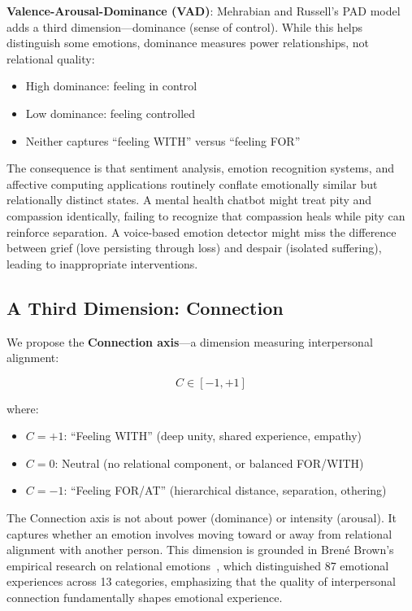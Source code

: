 \textbf{Valence-Arousal-Dominance (VAD)}: Mehrabian and Russell's PAD model~\cite{mehrabian1974} adds a third dimension—dominance (sense of control). While this helps distinguish some emotions, dominance measures power relationships, not relational quality:
\begin{itemize}
    \item High dominance: feeling in control
    \item Low dominance: feeling controlled
    \item Neither captures ``feeling WITH'' versus ``feeling FOR''
\end{itemize}

The consequence is that sentiment analysis, emotion recognition systems, and affective computing applications routinely conflate emotionally similar but relationally distinct states. A mental health chatbot might treat pity and compassion identically, failing to recognize that compassion heals while pity can reinforce separation. A voice-based emotion detector might miss the difference between grief (love persisting through loss) and despair (isolated suffering), leading to inappropriate interventions.

\subsection{A Third Dimension: Connection}

We propose the \textbf{Connection axis}—a dimension measuring interpersonal alignment:

$$C \in [-1, +1]$$

where:
\begin{itemize}
    \item $C = +1$: ``Feeling WITH'' (deep unity, shared experience, empathy)
    \item $C = 0$: Neutral (no relational component, or balanced FOR/WITH)
    \item $C = -1$: ``Feeling FOR/AT'' (hierarchical distance, separation, othering)
\end{itemize}

The Connection axis is not about power (dominance) or intensity (arousal). It captures whether an emotion involves moving toward or away from relational alignment with another person. This dimension is grounded in Brené Brown's empirical research on relational emotions~\cite{brown2021}, which distinguished 87 emotional experiences across 13 categories, emphasizing that the quality of interpersonal connection fundamentally shapes emotional experience.

